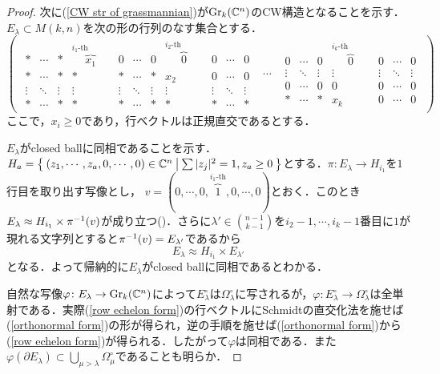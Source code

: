 \begin{proof}
  次に(\ref{CW str of grassmannian})が$\text{Gr}_k(\mathbb{C}^n)$のCW構造となることを示す．$E_\lambda\subset M(k, n)$を次の形の行列のなす集合とする．
  \small
  \begin{equation}\label{orthonormal form}
  \left(\begin{array}{ccc}
    {\begin{array}{ccccccccccc}
    * & \cdots & * & \overbrace{x_1}^{i_1\text{-th column}} & 0 & \cdots & 0 & \overbrace{0}^{i_{2}\text{-th column}} & 0 & \cdots & 0\\
    * & \cdots & * & * & * & \cdots & * & x_2 & 0 & \cdots & 0\\
    \vdots & \ddots & \vdots & \vdots & \vdots & \ddots & \vdots & \vdots & \vdots & \ddots & \vdots\\
    * & \cdots & * & * & * & \cdots & * & * & * & \cdots & * 
    \end{array}} & \cdots & 
    {\begin{array}{ccccccc}
    0 & \cdots & 0 & \overbrace{0}^{i_{k}\text{-th column}} & 0 &\cdots & 0\\
    \vdots & \ddots & \vdots & \vdots & \vdots & \ddots & \vdots\\
    0 & \cdots & 0 & 0 & 0 & \cdots & 0\\
    * & \cdots & * & x_k & 0 & \cdots & 0
    \end{array}}
  \end{array}\right)
\end{equation}
\normalsize
  ここで，$x_i\geq 0$であり，行ベクトルは正規直交であるとする．
  
  $E_\lambda$がclosed ballに同相であることを示す．$H_{a}=\left\{\:(z_1,\cdots,z_{a},0,\cdots,0)\in\mathbb{C}^n\:\middle|\:\sum|z_j|^2=1,z_{a}\geq 0\:\right\}$とする．$\pi\colon E_\lambda\rightarrow H_{i_1}$を$1$行目を取り出す写像とし，
  $v=(0,\cdots,0,\overbrace{1}^{i_1\text{-th}},0,\cdots,0)$とおく．このとき$E_\lambda\approx H_{i_1}\times\pi^{-1}(v)$が成り立つ(\cite{hatcher VB})．さらに$\lambda'\in\binom{n-1}{k-1}$を$i_2-1,\cdots,i_k-1$番目に$1$が現れる文字列とすると$\pi^{-1}(v)=E_{\lambda'}$であるから
  \[
  E_\lambda\approx H_{i_1}\times E_{\lambda'}
  \]
  となる．よって帰納的に$E_\lambda$がclosed ballに同相であるとわかる．

  自然な写像$\varphi\colon E_\lambda\rightarrow\text{Gr}_k(\mathbb{C}^n)$によって$E_\lambda^\circ$は$\Omega_\lambda^\circ$に写されるが，$\varphi\colon E_\lambda^\circ\rightarrow\Omega_\lambda^\circ$は全単射である．実際(\ref{row echelon form})の行ベクトルにSchmidtの直交化法を施せば(\ref{orthonormal form})の形が得られ，逆の手順を施せば(\ref{orthonormal form})から(\ref{row echelon form})が得られる．したがって$\varphi$は同相である．また$\varphi(\partial E_\lambda)\subset \bigcup_{\mu > \lambda} \Omega_{\mu}^\circ$であることも明らか．
\end{proof}

